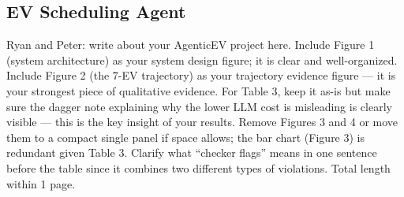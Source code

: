 \documentclass[journal,onecolumn]{IEEEtran} %
\newcommand{\todo}[1]{\color{red}#1\color{black}}
\begin{document}


\clearpage
\subsection{EV Scheduling Agent}
\todo{Ryan and Peter: write about your AgenticEV project here. 
Include Figure 1 (system architecture) as your system design figure; it is clear and well-organized. Include Figure 2 (the 7-EV trajectory) as your trajectory evidence figure --- it is your strongest piece of qualitative evidence. For Table 3, keep it as-is but make sure the dagger note explaining why the lower LLM cost is misleading is clearly visible --- this is the key insight of your results. Remove Figures 3 and 4 or move them to a compact single panel if space allows; the bar chart (Figure 3) is redundant given Table 3. Clarify what ``checker flags'' means in one sentence before the table since it combines two different types of violations. Total length within 1 page.}
\end{document}
